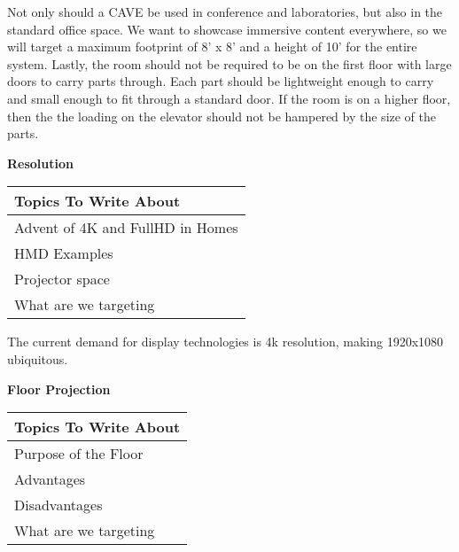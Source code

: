 	Not only should a CAVE be used in conference and laboratories, but also in the standard office space. We want to showcase immersive content everywhere, so we will target a maximum footprint of 8' x 8' and a height of 10' for the entire system. 
	Lastly, the room should not be required to be on the first floor with large doors to carry parts through. Each part should be lightweight enough to carry and small enough to fit through a standard door. If the room is on a higher floor, then the the loading on the elevator should not be hampered by the size of the parts.

\filbreak
\noindent\textbf{Resolution}\\
    \begin{center}
        \begin{table}[H]
            \centering
            \renewcommand\arraystretch{0.5}
            \begin{tabular}{|l|}
                \hline 
                Topics To Write About \\ 
                \hline 
                Advent of 4K and FullHD in Homes \\  
                HMD Examples  \\
                Projector space  \\
                What are we targeting \\
                \hline 
            \end{tabular}
        \end{table}
    \end{center}
    
	The current demand for display technologies is 4k resolution, making 1920x1080 ubiquitous.

\filbreak
\noindent\textbf{Floor Projection}\\
    \begin{center}
        \begin{table}[H]
            \centering
            \renewcommand\arraystretch{0.5}
            \begin{tabular}{|l|}
                \hline 
                Topics To Write About \\ 
                \hline 
                Purpose of the Floor \\  
                Advantages  \\
                Disadvantages  \\
                What are we targeting \\
                \hline 
            \end{tabular}
        \end{table}
    \end{center}
    
